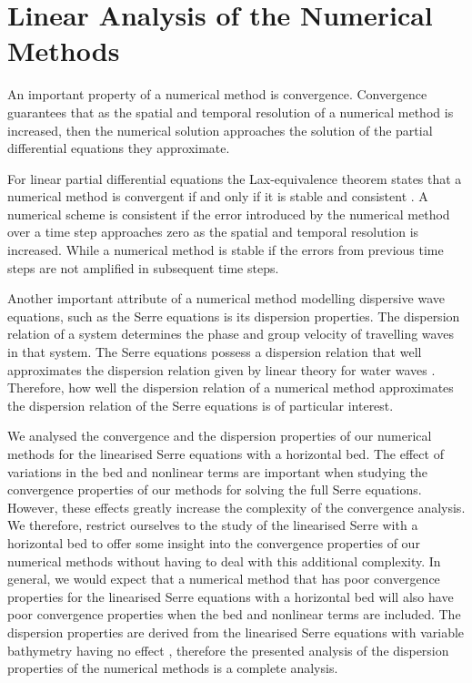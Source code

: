\chapter{Linear Analysis of the Numerical Methods}
\label{chp:AnalNumMethod}
An important property of a numerical method is convergence. Convergence guarantees that as the spatial and temporal resolution of a numerical method is increased, then the numerical solution approaches the solution of the partial differential equations they approximate. 

For linear partial differential equations the Lax-equivalence theorem states that a numerical method is convergent if and only if it is stable and consistent \cite{Lax-Richtmyer-1956-267}. A numerical scheme is consistent if the error introduced by the numerical method over a time step approaches zero as the spatial and temporal resolution is increased. While a numerical method is stable if the errors from previous time steps are not amplified in subsequent time steps.

Another important attribute of a numerical method modelling dispersive wave equations, such as the Serre equations is its dispersion properties. The dispersion relation of a system determines the phase and group velocity of travelling waves in that system. The Serre equations possess a dispersion relation that well approximates the dispersion relation given by linear theory for water waves \cite{Barthelemy-2004-315}. Therefore, how well the dispersion relation of a numerical method approximates the dispersion relation of the Serre equations is of particular interest.

We analysed the convergence and the dispersion properties of our numerical methods for the linearised Serre equations with a horizontal bed. The effect of variations in the bed and nonlinear terms are important when studying the convergence properties of our methods for solving the full Serre equations. However, these effects greatly increase the complexity of the convergence analysis. We therefore, restrict ourselves to the study of the linearised Serre with a horizontal bed to offer some insight into the convergence properties of our numerical methods without having to deal with this additional complexity. In general, we would expect that a numerical method that has poor convergence properties for the linearised Serre equations with a horizontal bed will also have poor convergence properties when the bed and nonlinear terms are included. The dispersion properties are derived from the linearised Serre equations with variable bathymetry having no effect \cite{Zoppou-etal-2017}, therefore the presented analysis of the dispersion properties of the numerical methods is a complete analysis.


